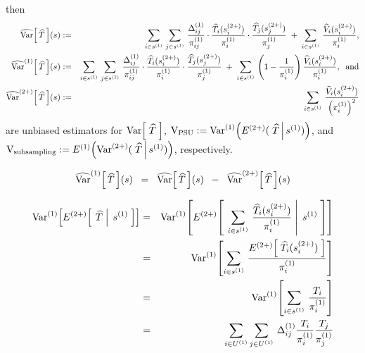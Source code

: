 \begin{theorem}
then
\begin{eqnarray*}
\widehat{\textnormal{Var}}\!\left[\,\widehat{T}\,\right]\!(s)
&:=&
\sum_{i\in s^{(1)}}\,\sum_{j\in s^{(1)}}\,
\dfrac{\Delta^{(1)}_{ij}}{\pi^{(1)}_{ij}}
\cdot
\dfrac{\widehat{T}_{i}(s^{(2+)}_{i})}{\pi^{(1)}_{i}}
\cdot
\dfrac{\widehat{T}_{j}(s^{(2+)}_{j})}{\pi^{(1)}_{j}}
\;+\;
\sum_{i\in s^{(1)}}\,\dfrac{\widehat{V}_{i}(s^{(2+)}_{i})}{\pi^{(1)}_{i}},
\\
\widehat{\textnormal{Var}}^{(1)}\!\left[\,\widehat{T}\,\right]\!(s)
&:=&
\sum_{i\in s^{(1)}}\,\sum_{j\in s^{(1)}}\,
\dfrac{\Delta^{(1)}_{ij}}{\pi^{(1)}_{ij}}
\cdot
\dfrac{\widehat{T}_{i}(s^{(2+)}_{i})}{\pi^{(1)}_{i}}
\cdot
\dfrac{\widehat{T}_{j}(s^{(2+)}_{j})}{\pi^{(1)}_{j}}
\;+\;
\sum_{i\in s^{(1)}}\,\left(1 - \dfrac{1}{\pi^{(1)}_{i}}\right)\dfrac{\widehat{V}_{i}(s^{(2+)}_{i})}{\pi^{(1)}_{i}},
\;\;\textnormal{and}
\\
\widehat{\textnormal{Var}}^{(2+)}\!\left[\,\widehat{T}\,\right]\!(s)
&:=&
\sum_{i\in s^{(1)}}\,\dfrac{\widehat{V}_{i}(s^{(2+)}_{i})}{\left(\pi^{(1)}_{i}\right)^{2}}
\end{eqnarray*}
are unbiased estimators for
$\textnormal{Var}\!\left[\;\widehat{T}\;\right]$,\;
$\textnormal{V}_{\textnormal{PSU}} := \textnormal{Var}^{(1)}\!\left(E^{(2+)}(\,\left.\widehat{T}\,\right\vert s^{(1)})\right)$,
and\;
$\textnormal{V}_{\textnormal{subsampling}} := E^{(1)}\!\left(\textnormal{Var}^{(2+)}(\,\left.\widehat{T}\,\right\vert s^{(1)})\right)$,
respectively.
\end{theorem}

\begin{corollary}
\begin{equation}
\widehat{\textnormal{Var}}^{(1)}\!\left[\,\widehat{T}\,\right]\!(s)
\;\;=\;\;
\widehat{\textnormal{Var}}\!\left[\,\widehat{T}\,\right]\!(s)
\;\;-\;\;
\widehat{\textnormal{Var}}^{(2+)}\!\left[\,\widehat{T}\,\right]\!(s)
\end{equation}
\end{corollary}

\proof

\begin{eqnarray*}
\textnormal{Var}^{(1)}\!\left[E^{(2+)}\!\left[\;\left.\widehat{T}\;\right\vert\;s^{(1)}\;\right]\right]
&=&
\textnormal{Var}^{(1)}\!\left[E^{(2+)}\!\left[\;\left.
\sum_{i\in s^{(1)}}\,\frac{\widehat{T}_{i}(s^{(2+)}_{i})}{\pi^{(1)}_{i}}
\;\right\vert\;s^{(1)}\;\right]\right]
\\
&=&
\textnormal{Var}^{(1)}\!\left[\sum_{i\in s^{(1)}}\,
\frac{E^{(2+)}\!\left[\;\widehat{T}_{i}(s^{(2+)}_{i})\;\right]}{\pi^{(1)}_{i}}
\right]
\\
&=&
\textnormal{Var}^{(1)}\!\left[\sum_{i\in s^{(1)}}\,\frac{T_{i}}{\pi^{(1)}_{i}}\right]
\\
&=&
\sum_{i\in U^{(1)}}\sum_{j\in U^{(1)}}\,\Delta^{(1)}_{ij}\frac{T_{i}}{\pi^{(1)}_{i}}\frac{T_{j}}{\pi^{(1)}_{j}}
\end{eqnarray*}

